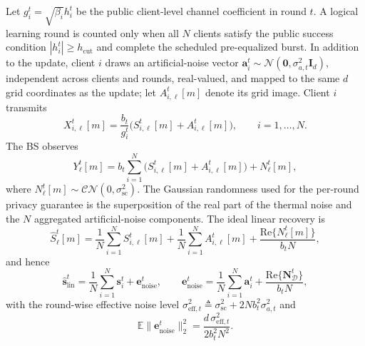 \documentclass[journal]{IEEEtran}
\begin{document}
Let $g_i^t=\sqrt{\beta_i}h_i^t$ be the public client-level channel coefficient in round $t$. A logical learning round is counted only when all $N$ clients satisfy the public success condition $|h_i^t|\ge h_{\mathrm{cut}}$ and complete the scheduled pre-equalized burst. In addition to the update, client $i$ draws an artificial-noise vector $\mathbf a_i^t\sim\mathcal N(\mathbf 0,\sigma_{a,t}^2\mathbf I_d)$, independent across clients and rounds, real-valued, and mapped to the same $d$ grid coordinates as the update; let $A_{i,\ell}^t[m]$ denote its grid image. Client $i$ transmits
\begin{equation}
 X_{i,\ell}^t[m]=\frac{b_t}{g_i^t}\big(S_{i,\ell}^t[m]+A_{i,\ell}^t[m]\big),\qquad i=1,\ldots,N.
\end{equation}
The BS observes
\begin{equation}
 Y_\ell^t[m]=b_t\sum_{i=1}^{N}\big(S_{i,\ell}^t[m]+A_{i,\ell}^t[m]\big)+N_\ell^t[m],
 \label{eqn:freq_aircomp}
\end{equation}
where $N_\ell^t[m]\sim\mathcal{CN}(0,\sigma_{\mathrm{sc}}^2)$. The Gaussian randomness used for the per-round privacy guarantee is the superposition of the real part of the thermal noise and the $N$ aggregated artificial-noise components. The ideal linear recovery is
\begin{equation}
 \hat S_\ell^t[m]=\frac1N\sum_{i=1}^{N}S_{i,\ell}^t[m]
 +\frac1N\sum_{i=1}^{N}A_{i,\ell}^t[m]+\frac{\mathrm{Re}\{N_\ell^t[m]\}}{b_tN},
 \label{eqn:recover}
\end{equation}
and hence
\begin{equation}
 \hat{\mathbf s}_{\mathrm{lin}}^t=\frac1N\sum_{i=1}^{N}\mathbf s_i^t+\mathbf e_{\mathrm{noise}}^t,
 \qquad \mathbf e_{\mathrm{noise}}^t=\frac1N\sum_{i=1}^{N}\mathbf a_i^t+\frac{\mathrm{Re}\{\mathbf N_{\mathcal D}^t\}}{b_tN},
 \label{eqn:linear_recovery}
\end{equation}
with the round-wise effective noise level $\sigma_{\mathrm{eff},t}^2\triangleq\sigma_{\mathrm{sc}}^2+2Nb_t^2\sigma_{a,t}^2$ and
\begin{equation}
 \mathbb E\|\mathbf e_{\mathrm{noise}}^t\|_2^2
 =\frac{d\,\sigma_{\mathrm{eff},t}^2}{2b_t^2N^2}.
 \label{eqn:channel_error_energy}
\end{equation}
\end{document}
